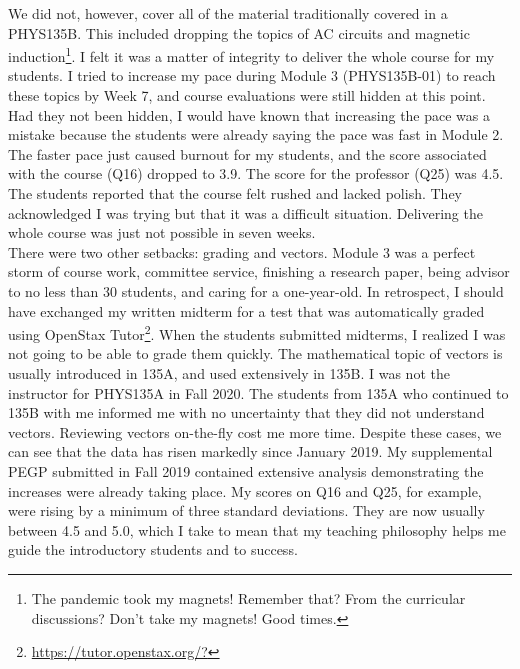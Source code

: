 \documentclass[../../../main.tex]{subfiles}
\begin{document}
We did not, however, cover all of the material traditionally covered in a PHYS135B.  This included dropping the topics of AC circuits and magnetic induction\footnote{The pandemic took my magnets!  Remember that?  From the curricular discussions?  Don't take my magnets!  Good times.}.  I felt it was a matter of integrity to deliver the whole course for my students. I tried to increase my pace during Module 3 (PHYS135B-01) to reach these topics by Week 7, and course evaluations were still hidden at this point.  Had they not been hidden, I would have known that increasing the pace was a mistake because the students were already saying the pace was fast in Module 2.  The faster pace just caused burnout for my students, and the score associated with the course (Q16) dropped to 3.9.  The score for the professor (Q25) was 4.5.  The students reported that the course felt rushed and lacked polish.  They acknowledged I was trying but that it was a difficult situation.  Delivering the whole course was just not possible in seven weeks.
\\
\vspace{0.15cm}
There were two other setbacks: grading and vectors.  Module 3 was a perfect storm of course work, committee service, finishing a research paper, being advisor to no less than 30 students, and caring for a one-year-old. In retrospect, I should have exchanged my written midterm for a test that was automatically graded using OpenStax Tutor\footnote{\url{https://tutor.openstax.org/?}}.  When the students submitted midterms, I realized I was not going to be able to grade them quickly.  The mathematical topic of vectors is usually introduced in 135A, and used extensively in 135B.  I was not the instructor for PHYS135A in Fall 2020.  The students from 135A who continued to 135B with me informed me with no uncertainty that they did not understand vectors.  Reviewing vectors on-the-fly cost me more time.  Despite these cases, we can see that the data has risen markedly since January 2019.  My supplemental PEGP submitted in Fall 2019 contained extensive analysis demonstrating the increases were already taking place.  My scores on Q16 and Q25, for example, were rising by a minimum of three standard deviations.  They are now usually between 4.5 and 5.0, which I take to mean that my teaching philosophy helps me guide the introductory students and to success.
\\
\vspace{0.15cm}
\end{document}
